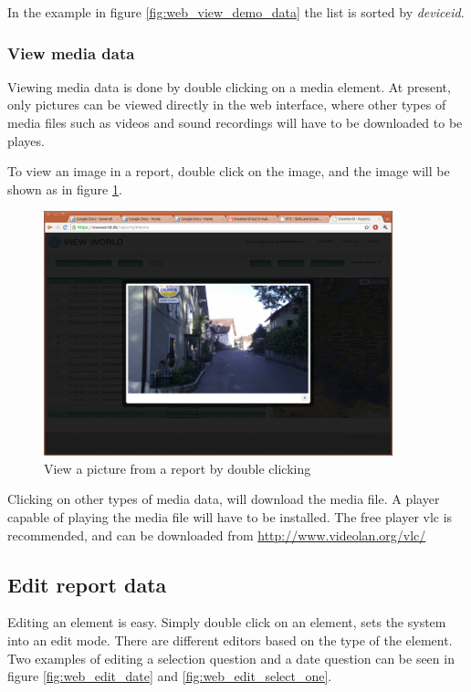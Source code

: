\documentclass[a4paper, 12pt, final]{article}
\begin{document}
In the example in figure \ref{fig:web_view_demo_data} the list is sorted by \emph{deviceid}.

\subsubsection{View media data}

Viewing media data is done by double clicking on a media element. At present, only pictures can be viewed directly in the web interface, where other types of media files such as videos and sound recordings will have to be downloaded to be playes.

To view an image in a report, double click on the image, and the image will be shown as in figure \ref{fig:web_view_picture}.

\begin{figure}[H]
  \centering
  \includegraphics[width=0.9\textwidth]{pics/web_view_picture.png}
  \caption{View a picture from a report by double clicking}
  \label{fig:web_view_picture}
\end{figure}

Clicking on other types of media data, will download the media file. A player capable of playing the media file will have to be installed. The free player vlc is recommended, and can be downloaded from \url{http://www.videolan.org/vlc/}

\subsection{Edit report data}

Editing an element is easy. Simply double click on an element, sets the system into an edit mode. There are different editors based on the type of the element.
Two examples of editing a selection question and a date question can be seen in figure \ref{fig:web_edit_date} and \ref{fig:web_edit_select_one}.
\end{document}
